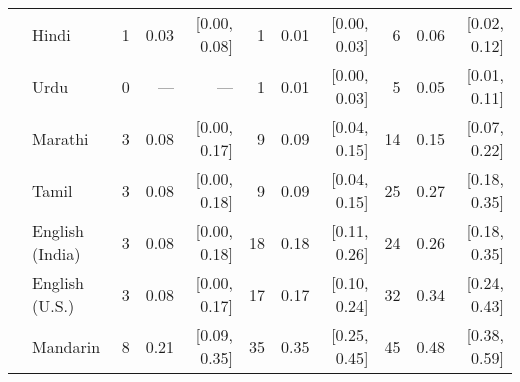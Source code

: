 \begin{table}[t]
\begin{footnotesize}
\begin{tabular}{p{.1in}lrrrrrrrrr}
 & Hindi & 1 & 0.03 & [0.00, 0.08] & 1 & 0.01 & [0.00, 0.03] & 6 & 0.06 & [0.02, 0.12]\\

 & Urdu & 0 & --- & --- & 1 & 0.01 & [0.00, 0.03] & 5 & 0.05 & [0.01, 0.11]\\

 & Marathi & 3 & 0.08 & [0.00, 0.17] & 9 & 0.09 & [0.04, 0.15] & 14 & 0.15 & [0.07, 0.22]\\

 & Tamil & 3 & 0.08 & [0.00, 0.18] & 9 & 0.09 & [0.04, 0.15] & 25 & 0.27 & [0.18, 0.35]\\

 & English (India) & 3 & 0.08 & [0.00, 0.18] & 18 & 0.18 & [0.11, 0.26] & 24 & 0.26 & [0.18, 0.35]\\

 & English (U.S.) & 3 & 0.08 & [0.00, 0.17] & 17 & 0.17 & [0.10, 0.24] & 32 & 0.34 & [0.24, 0.43]\\

& Mandarin & 8 & 0.21 & [0.09, 0.35] & 35 & 0.35 & [0.25, 0.45] & 45 & 0.48 & [0.38, 0.59]\\

\bottomrule
\end{tabular}
\end{footnotesize}
\end{table}